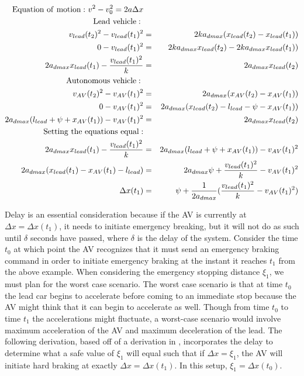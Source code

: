 \documentclass[conference]{IEEEtran}
\begin{document}
\begin{appendix}
\begin{eqnarray*}
{\rm Equation\ of\ motion:\ } v^2-v_0^2 = 2a\Delta x \\
{\rm Lead\ vehicle:\ } \\
v_{lead}(t_2)^2-v_{lead}(t_1)^2 &=& 2 ka_{dmax}(x_{lead}(t_2)-x_{lead}(t_1)) \\
0-v_{lead}(t_1)^2 &=& 2ka_{dmax}x_{lead}(t_2)-2ka_{dmax}x_{lead}(t_1)) \\
2a_{dmax}x_{lead}(t_1) -{v_{lead}(t_1)^2\over k} &=& 2a_{dmax}x_{lead}(t_2) \\
{\rm Autonomous\ vehicle:\ } \\
v_{AV}(t_2)^2-v_{AV}(t_1)^2 &=& 2 a_{dmax}(x_{AV}(t_2)-x_{AV}(t_1)) \\
0-v_{AV}(t_1)^2 &=& 2a_{dmax}(x_{lead}(t_2)-l_{lead}-\psi-x_{AV}(t_1)) \\
2a_{dmax}(l_{lead}+\psi+x_{AV}(t_1))-v_{AV}(t_1)^2 &=& 2a_{dmax}x_{lead}(t_2)\\
{\rm Setting\ the\ equations\ equal:} \\
2a_{dmax}x_{lead}(t_1) -{v_{lead}(t_1)^2\over k} &=& 2a_{dmax}(l_{lead}+\psi+x_{AV}(t_1))-v_{AV}(t_1)^2 \\
2a_{dmax}(x_{lead}(t_1)-x_{AV}(t_1)-l_{lead}) &=& 2a_{dmax}\psi+{v_{lead}(t_1)^2\over k}-v_{AV}(t_1)^2\\
\Delta x(t_1) &=& \psi+{1\over 2a_{dmax}}({v_{lead}(t_1)^2\over k}-v_{AV}(t_1)^2) \\
\end{eqnarray*}

Delay is an essential consideration because if the AV is currently at $\Delta x=\Delta x(t_1)$, it needs to initiate emergency breaking, but it will not do as such until $\delta$ seconds have passed, where $\delta$ is the delay of the system. Consider the time $t_0$ at which point the AV recognizes that it must send an emergency braking command in order to initiate emergency braking at the instant it reaches $t_1$ from the above example. When considering the emergency stopping distance $\xi_1$, we must plan for the worst case scenario. The worst case scenario is that at time $t_0$ the lead car begins to accelerate before coming to an immediate stop because the AV might think that it can begin to accelerate as well. Though from time $t_0$ to time $t_1$ the accelerations might fluctuate, a worst-case scenario would involve maximum acceleration of the AV and maximum deceleration of the lead. The following derivation, based off of a derivation in \cite{bhadani2019real}, incorporates the delay to determine what a safe value of $\xi_1$ will equal such that if $\Delta x=\xi_1$, the AV will initiate hard braking at exactly $\Delta x = \Delta x(t_1)$. In this setup, $\xi_1=\Delta x(t_0)$.


\end{appendix}
\end{document}
